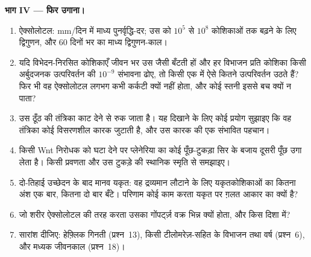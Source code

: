 \begin{problem}
\medskip
\noindent\textbf{भाग IV --- फिर उगाना।}
\begin{enumerate}[resume]
  \item ऐक्सोलोटल: mm/दिन में माध्य पुनर्वृद्धि-दर; उस  को
        $10^{5}$ से $10^{8}$ कोशिकाओं तक बढ़ने के लिए द्विगुणन, और 60
        दिनों भर का माध्य द्विगुणन-काल।
  \item यदि विभेदन-निरसित कोशिकाएँ जीवन भर उस  जैसी बँटती हों
        और हर विभाजन प्रति कोशिका किसी अर्बुदजनक उत्परिवर्तन की
        $10^{-9}$ संभावना ढोए, तो किसी एक  में ऐसे कितने
        उत्परिवर्तन उठते हैं? फिर भी वह ऐक्सोलोटल लगभग कभी कर्कटी क्यों
        नहीं होता, और कोई स्तनी इससे बच क्यों न पाता?
  \item उस ठूँठ की तंत्रिका काट देने से  रुक जाता है। यह दिखाने
        के लिए कोई प्रयोग सुझाइए कि वह तंत्रिका कोई विसरणशील कारक
        जुटाती है, और उस कारक की एक संभावित पहचान।
  \item किसी Wnt निरोधक को घटा देने पर प्लेनेरिया का कोई पूँछ-टुकड़ा
        सिर के बजाय दूसरी पूँछ उगा लेता है। किसी प्रवणता और उस टुकड़े की
        स्थानिक स्मृति से समझाइए।
  \item दो-तिहाई उच्छेदन के बाद मानव यकृत: वह द्रव्यमान लौटाने के लिए
        यकृतकोशिकाओं का कितना अंश एक बार, कितना दो बार बँटे। परिणाम कोई
        काम करता यकृत पर ग़लत आकार का क्यों है?
  \item जो शरीर ऐक्सोलोटल की तरह  करता उसका गोंपर्ट्ज़ वक्र
        भिन्न क्यों होता, और किस दिशा में?
  \item सारांश दीजिए: हेफ़्लिक गिनती (प्रश्न~13), किसी टीलोमरेज़-सहित
         के विभाजन तथा वर्ष (प्रश्न~6), और मध्यक जीवनकाल
        (प्रश्न~18)।
\end{enumerate}
\end{problem}

